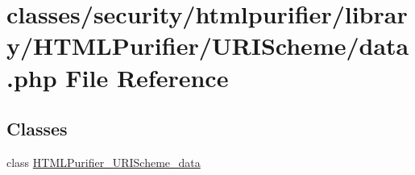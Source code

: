 \hypertarget{data_8php}{\section{classes/security/htmlpurifier/library/\+H\+T\+M\+L\+Purifier/\+U\+R\+I\+Scheme/data.php File Reference}
\label{data_8php}
}
\subsection*{Classes}
\begin{DoxyCompactItemize}
\item 
class \hyperlink{classHTMLPurifier__URIScheme__data}{H\+T\+M\+L\+Purifier\+\_\+\+U\+R\+I\+Scheme\+\_\+data}
\end{DoxyCompactItemize}
